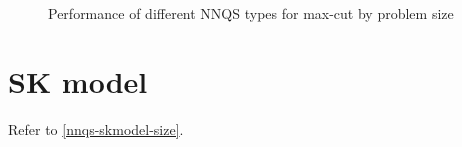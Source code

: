 \begin{figure}[!htbp]
    \centering
    \\
    \caption{Performance of different NNQS types for max-cut by problem size}
    \label{nnqs-maxcut-size}
\end{figure}

\section{SK model}
Refer to \autoref{nnqs-skmodel-size}.

